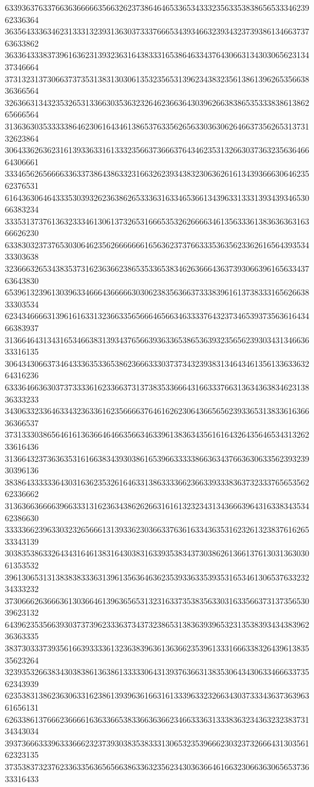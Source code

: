 63393637633766363666663566326237386464653365343332356335383865653334623962336364
36356433363462313331323931363037333766653439346632393432373938613466373763633862
36336433383739616362313932363164383331653864633437643066313430306562313437346664
37313231373066373735313831303061353235653139623438323561386139626535663836366564
32636631343235326531336630353632326462366364303962663838653533383861386265666564
31363630353333386462306164346138653763356265633036306264663735626531373132623864
30643362636231613933633161333235663736663764346235313266303736323563646664306661
33346562656666336337386438633231663262393438323063626161343936663064623562376531
61643630646433353039326236386265333631633465366134396331333139343934653066383234
33353137376136323334613061373265316665353262666634613563336138363636316366626230
63383032373765303064623562666666616563623737663335363562336261656439353433303638
32366632653438353731623636623865353365383462636664363739306639616563343763643830
65396132396130396334666436666630306238356366373338396161373833316562663833303534
62343466663139616163313236633565666465663463333764323734653937356361643466383937
31366464313431653466383139343765663936336538653639323565623930343134663633316135
30643430663734643336353365386236663330373734323938313464346135613363363264316236
63336466363037373333616233663731373835336664316633376631363436383462313836333233
34306332336463343236336162356666376461626230643665656239336531383361636636366537
37313330386564616136366464663566346339613836343561616432643564653431326233616436
31366432373636353161663834393038616539663333386636343766363063356239323930396136
38386433333364303163623532616463313863333662366339333836373233376565356262336662
31363663666639663331316236343862626631616132323431343666396431633834353462386630
33333662396330323265666131393362303663376361633436353162326132383761626533343139
30383538633264343164613831643038316339353834373038626136613761303136303061353532
39613065313138383833363139613563646362353933633539353165346130653763323234333232
37306662636663613036646139636565313231633735383563303163356637313735653039623132
64396235356639303737396233363734373238653138363939653231353839343438396236363335
38373033373935616639333361323638396361363662353961333166633832643961383535623264
32393532663834303838613638613333306431393763663138353064343063346663373562343939
62353831386236306331623861393963616631613339633232663430373334363736396361656131
62633861376662366661636336653833663636623466333631333836323436323238373134343034
39373666333963336662323739303835383331306532353966623032373266643130356162323135
37353837323762336335636565663863363235623430363664616632306636306565373633316433
